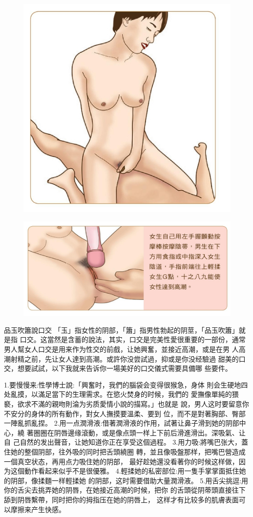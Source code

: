 \documentclass[12pt,UTF8]{ctexbook}
\begin{document}
\begin{figure}[htbp]
	\centering
	\includegraphics[width=0.7\linewidth]{17}
	\caption{}
	\label{fig:1}
\end{figure}

\begin{figure}[htbp]
	\centering
	\includegraphics[width=0.7\linewidth]{18}
	\caption{}
	\label{fig:1}
\end{figure}

品玉吹簫說口交
「玉」指女性的阴部，「簫」指男性勃起的阴莖，「品玉吹簫」就是指
口交。这當然是含蓄的說法，其实，口交是完美性愛很重要的一部份，通常
男人幫女人口交是用来作为性交的前戲，让她興奮，並接近高潮，或是在男
人高潮射精之前，先让女人達到高潮。或許你没尝試過，抑或是你没经驗過
甜美的口交，想要試試，以下我就来告诉你一場美好的口交儀式需要具備哪
些要件。

1.要慢慢来:性學博士說:「興奮时，我們的腦袋会变得很猴急，身体
則会生硬地四处亂摸，以滿足當下的生理需求。在慾火焚身的时候，我們的
愛撫像單純的猥褻，欲求不滿的親吻則淪为劣质愛情小說的描寫。」也就是
說，男人这时要留意你不安分的身体的所有動作，對女人撫摸要溫柔、要到
位，而不是對著胸部、臀部一陣亂抓亂捏。
2.用一点潤滑液:借著潤滑液的作用，試著让鼻子滑到她的阴部中心，繞
著圈圈在阴唇邊缘滾動，或是像点頭一样上下前后滑進滑出。深吸氣、让自
己自然的发出聲音，让她知道你正在享受这個過程。
3.用力吸:將嘴巴张大，蓋住她的整個阴部，往外吸的同时把舌頭繞圈
轉，並且像吸盤那样，把嘴巴營造成一個真空状态，再用点力吸住她的阴部，
最好趁她還没看著你的时候这样做，因为这個動作看起来似乎不是很優雅。
4.輕揉她的私密部位:用一隻手掌掌面抵住她的阴部，像揉麵一样輕揉她
的阴部，这时需要借助大量潤滑液。
5.用舌尖挑逗:用你的舌尖去挑弄她的阴唇，在她接近高潮的时候，把你
的舌頭從阴蒂頭直接往下舔到阴唇繫帶，同时把你的拇指压在她的阴唇上，
这样才有比较多的肌膚表面可以摩擦来产生快感。
\end{document}
